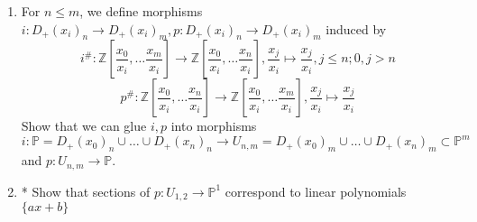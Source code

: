 \documentclass[a4paper,11pt]{article}
\def\bb#1{\mathbb{#1}}
\def\bZ{\mathbb{Z}}
\begin{document}
\begin{enumerate}[1.]
\begin{enumerate}
    \item  For $n\leq m$, we define morphisms $i: D_+(x_i)_n\to D_+(x_i)_m, p:D_+(x_i)_n\to D_+(x_i)_m$ induced by 
    \[i^\#:\bZ[\frac{x_0}{x_i},\ldots \frac{x_m}{x_i}]\to \bZ[\frac{x_0}{x_i},\ldots \frac{x_n}{x_i}],  \frac{x_j}{x_i} \mapsto \frac{x_j}{x_i}, j\leq n; 0 , j>n \]
    \[p^\#:\bZ[\frac{x_0}{x_i},\ldots \frac{x_n}{x_i}]\to \bZ[\frac{x_0}{x_i},\ldots \frac{x_m}{x_i}],  \frac{x_j}{x_i} \mapsto \frac{x_j}{x_i}\] 
    Show that we can glue $i,p$ into morphisms 
    \[i:\bb{P}= D_+(x_0)_n\cup \ldots \cup D_+(x_n)_n \to U_{n,m}= D_+(x_0)_m\cup \ldots  \cup D_+(x_n)_m \subset \bb{P}^m \]
    and $p:U_{n,m}\to \bb{P}$.
    \item* Show that sections of $p:U_{1,2}\to \bb{P}^1$ correspond to linear polynomials $\{ ax+b \}$
\end{enumerate}



\end{enumerate}
\end{document}
